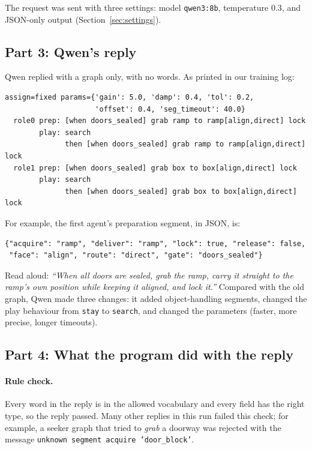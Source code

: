 \documentclass[11pt]{article}
\begin{document}
The request was sent with three settings: model \texttt{qwen3:8b},
temperature $0.3$, and JSON-only output (Section~\ref{sec:settings}).

\subsection{Part 3: Qwen's reply}

Qwen replied with a graph only, with no words. As printed in our training log:

{\small
\begin{verbatim}
assign=fixed params={'gain': 5.0, 'damp': 0.4, 'tol': 0.2,
                     'offset': 0.4, 'seg_timeout': 40.0}
  role0 prep: [when doors_sealed] grab ramp to ramp[align,direct] lock
        play: search
              then [when doors_sealed] grab ramp to ramp[align,direct] lock
  role1 prep: [when doors_sealed] grab box to box[align,direct] lock
        play: search
              then [when doors_sealed] grab box to box[align,direct] lock
\end{verbatim}
}

\noindent For example, the first agent's preparation segment, in JSON, is:

{\small
\begin{verbatim}
{"acquire": "ramp", "deliver": "ramp", "lock": true, "release": false,
 "face": "align", "route": "direct", "gate": "doors_sealed"}
\end{verbatim}
}

\noindent Read aloud: \emph{``When all doors are sealed, grab the ramp, carry it
straight to the ramp's own position while keeping it aligned, and lock it.''}
Compared with the old graph, Qwen made three changes: it added object-handling
segments, changed the play behaviour from \texttt{stay} to \texttt{search}, and
changed the parameters (faster, more precise, longer timeouts).

\subsection{Part 4: What the program did with the reply}

\paragraph{Rule check.} Every word in the reply is in the allowed vocabulary and
every field has the right type, so the reply passed. Many other replies in this
run failed this check; for example, a seeker graph that tried to \emph{grab} a
doorway was rejected with the message
\texttt{unknown segment acquire 'door\_block'}.
\end{document}
